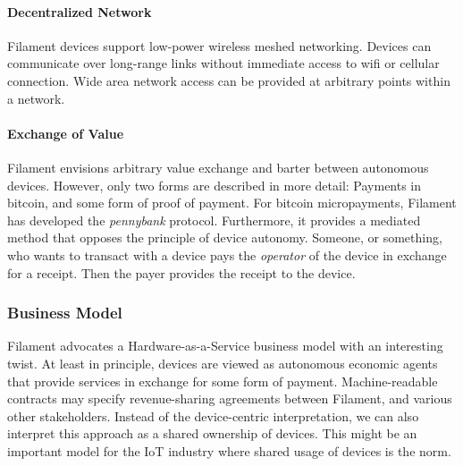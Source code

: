 \paragraph{Decentralized Network}
Filament devices support low-power wireless meshed networking. Devices can communicate over long-range links without immediate access to wifi or cellular connection. Wide area network access can be provided at arbitrary points within a network.


\paragraph{Exchange of Value}

Filament envisions arbitrary value exchange and barter between autonomous devices. However, only two forms are described in more detail: Payments in bitcoin, and some form of proof of payment. For bitcoin micropayments, Filament has developed the \emph{pennybank} protocol. Furthermore, it provides a mediated method that opposes the principle of device autonomy. Someone, or something, who wants to transact with a device pays the \emph{operator} of the device in exchange for a receipt. Then the payer provides the receipt to the device. 






\subsubsection{Business Model}

Filament advocates a Hardware-as-a-Service business model with an interesting twist. At least in principle,  devices are viewed as autonomous economic agents that provide services in exchange for some form of payment. Machine-readable contracts may specify revenue-sharing agreements between Filament, and various other stakeholders. Instead of the device-centric interpretation, we can also interpret this approach as a shared ownership of devices. This might be an important model for the IoT industry where shared usage of devices is the norm.


